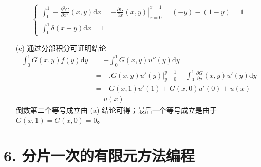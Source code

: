 \documentclass[a4paper]{article}
\begin{document}
\begin{enumerate}
\begin{equation}
                \begin{cases}
                    \displaystyle\int_{0}^{1}-\frac{\partial^2 G}{\partial x^2}(x,y)\text{d}x=
                    \left.-\frac{\partial G}{\partial x}(x,y)\right|_{x=0}^{x=1}
                    =(-y)-(1-y)=1\\
                    \displaystyle\int_{0}^{1}\delta(x-y)\text{d}x=1
                \end{cases}
            \end{equation}
        \item[(c)] 通过分部积分可证明结论 
            \begin{equation}
                \begin{aligned}
                    \int_{0}^{1}G(x,y)f(y)\text{d}y
                    &=-\int_{0}^{1}G(x,y)u''(y)\text{d}y\\
                    &=-\Big.G(x,y)u'(y)\Big|_{y=0}^{y=1}
                    +\int_{0}^{1}\frac{\partial G}{\partial y}(x,y)u'(y)\text{d}y\\
                    &=-G(x,1)u'(1)+G(x,0)u'(0) + u(x)\\
                    &=u(x)
                \end{aligned}
            \end{equation}
            倒数第二个等号成立由 (a) 结论可得；最后一个等号成立是由于$G(x,1)=G(x,0)=0$。
\end{enumerate}

\section*{6. 分片一次的有限元方法编程}


\printbibliography
\end{document}
